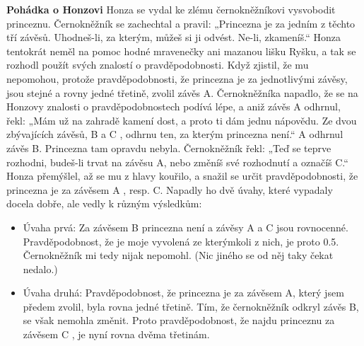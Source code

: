\wikitextrule
\begin{example}\label{mai:exam062}
  \textbf{Pohádka o Honzovi}\newline\small
  Honza se vydal ke zlému černokněžníkovi vysvobodit princeznu. Černokněžník se zachechtal a 
  pravil: „Princezna je za jedním z těchto tří závěsů. Uhodneš-li, za kterým, můžeš si ji odvést. 
  Ne-li, zkameníš.“ Honza tentokrát neměl na pomoc hodné mravenečky ani mazanou lišku Ryšku, a tak 
  se rozhodl použít svých znalostí o pravděpodobnosti. Když zjistil, že mu nepomohou, protože 
  pravděpodobnosti, že princezna je za jednotlivými závěsy, jsou stejné a rovny jedné třetině, 
  zvolil závěs A. Černokněžníka napadlo, že se na Honzovy znalosti o pravděpodobnostech podívá 
  lépe, a aniž závěs A odhrnul, řekl: „Mám už na zahradě kamení dost, a proto ti dám jednu 
  nápovědu. Ze dvou zbývajících závěsů, B a C , odhrnu ten, za kterým princezna není.“ A odhrnul 
  závěs B. Princezna tam opravdu nebyla. Černokněžník řekl: „Teď se teprve rozhodni, budeš-li trvat 
  na závěsu A, nebo změníš své rozhodnutí a označíš C.“ Honza přemýšlel, až se mu z hlavy kouřilo, 
  a snažil se určit pravděpodobnosti, že princezna je za závěsem A , resp. C. Napadly ho dvě úvahy, 
  které vypadaly docela dobře, ale vedly k různým výsledkům:
  \begin{itemize}
  \item Úvaha prvá: Za závěsem B princezna není a závěsy A a C jsou rovnocenné. Pravděpodobnost, že 
        je moje vyvolená ze kterýmkoli z nich, je proto \num{0.5}. Černokněžník mi tedy nijak 
        nepomohl. (Nic jiného se od něj taky čekat nedalo.)
  \item Úvaha druhá: Pravděpodobnost, že princezna je za závěsem A, který jsem předem zvolil, byla 
        rovna jedné třetině. Tím, že černokněžník odkryl závěs B, se však nemohla změnit. Proto 
        pravděpodobnost, že najdu princeznu za závěsem C , je nyní rovna dvěma třetinám.
  \end{itemize}
  

\end{example}
